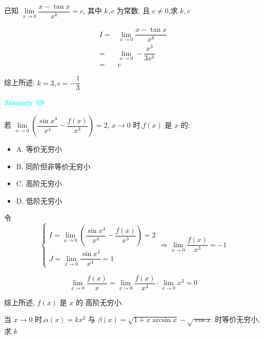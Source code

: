 \begin{example}[][Exam: 27.3.8]
	已知 $\lim\limits_{x\to 0}\dfrac{x-\tan x}{x^{k}}=c$, 其中 $k,c$ 为常数, 且 $c\neq 0$,求 $k,c$
\end{example}

\begin{solution}

	\begin{align*}
		I = & \lim\limits_{x\to 0}\dfrac{x-\tan x}{x^{k}}\\
		  = & \lim\limits_{x\to 0}-\dfrac{x^{3}}{3x^{k}}\\
		  = & c
	\end{align*}

	综上所述: $k = 3, c = -\dfrac{1}{3}$
\end{solution}

\textcolor{cyan}{\textbf{January 19}}

\begin{example}[][Exam: 27.3.9]
	若 $\lim\limits_{x\to 0}\left(\dfrac{\sin x^{4}}{x^{4}}-\dfrac{f(x)}{x^{3}}\right)=2$,  $x\to 0$ 时,$f(x)$ 是 $x$ 的:
\begin{itemize}
	\item A. 等价无穷小
	\item B. 同阶但非等价无穷小
	\item C. 高阶无穷小
	\item D. 低阶无穷小
\end{itemize}
\end{example}

\begin{solution}

	令 
	$$\begin{cases}
		I = \lim\limits_{x\to 0}\left(\dfrac{\sin x^{4}}{x^{4}}-\dfrac{f(x)}{x^{3}}\right) = 2\\
		J = \lim\limits_{x\to 0}\dfrac{\sin x^{4}}{x^{4}} = 1
	\end{cases}\Rightarrow \lim\limits_{x\to 0}\dfrac{f(x)}{x^{3}} = -1$$

	$$\lim\limits_{x\to 0}\dfrac{f(x)}{x} = \lim\limits_{x\to 0}\dfrac{f(x)}{x^{4}}\cdot\lim\limits_{x\to 0}x^{3} = 0$$

	综上所述, $f(x)$ 是 $x$ 的 高阶无穷小.
\end{solution}

\begin{example}[][Exam: 27.3.10]
	当 $x\to 0$ 时,$\alpha(x)=kx^{2}$ 与 $\beta(x)=\sqrt{1+x\arcsin x}-\sqrt{\cos x}$ 时等价无穷小,求 $k$
\end{example}

